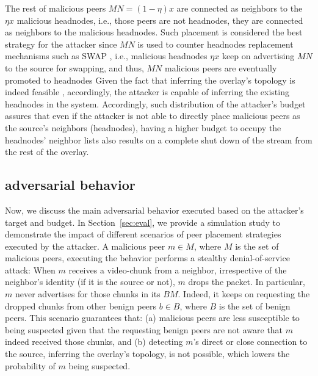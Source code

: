 The rest of malicious peers $MN=(1-\eta) x$ are connected as neighbors to the $\eta x$ malicious headnodes, i.e., those peers are not headnodes, they are connected as neighbors to the malicious headnodes. 
Such placement is considered the best strategy for the attacker since $MN$ is used to counter headnodes replacement mechanisms such as SWAP \cite{nguyen2016swap}, i.e., malicious headnodes $\eta x$ keep on advertising $MN$ to the source for swapping, and thus, $MN$ malicious peers are eventually promoted to headnodes
Given the fact that inferring the overlay's topology is indeed feasible \cite{nguyen2016swap,rbcs}, accordingly, the attacker is capable of inferring the existing headnodes in the system.
Accordingly, such distribution of the attacker's budget assures that even if the attacker is not able to directly place malicious peers as the source's neighbors (headnodes), having a higher budget to occupy the headnodes' neighbor lists also results on a complete shut down of the stream from the rest of the overlay.



\subsection{\drop adversarial behavior}
Now, we discuss the main adversarial behavior executed based on the attacker's target and budget. 
In Section~\ref{sec:eval}, we provide a simulation study to demonstrate the impact of different scenarios of peer placement strategies executed by the attacker. 
A malicious peer $m \in M$, where $M$ is the set of malicious peers, executing the \drop behavior performs a stealthy denial-of-service attack: 
When $m$ receives a video-chunk from a neighbor, irrespective of the neighbor's identity (if it is the source or not), $m$ drops the packet.
In particular, $m$ never advertises for those chunks in its $BM$.
Indeed, it keeps on requesting the dropped chunks from other benign peers $b \in B$, where $B$ is the set of benign peers.
This scenario guarantees that: (a) malicious peers are less susceptible to being suspected given that the requesting benign peers are not aware that $m$ indeed received those chunks,
and (b) detecting $m$'s direct or close connection to the source, inferring the overlay's topology, is not possible, which lowers the probability of $m$ being suspected.

